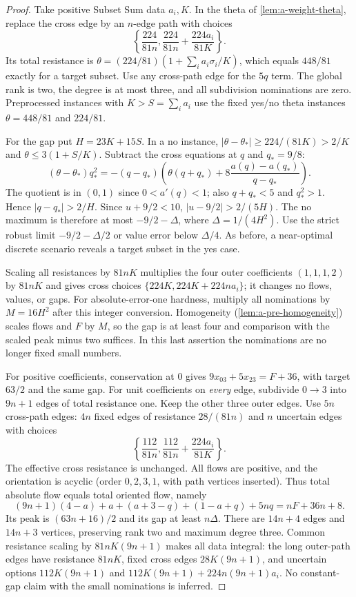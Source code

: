\begin{proof}
Take positive Subset Sum data $a_i,K$. In the theta of
\cref{lem:a-weight-theta}, replace the cross edge by an $n$-edge path
with choices
\[
 \left\{\frac{224}{81n},
 \frac{224}{81n}+\frac{224a_i}{81K}\right\}.
\]
Its total resistance is
$\theta=(224/81)(1+\sum_i a_i\sigma_i/K)$, which equals $448/81$
exactly for a target subset. Use any cross-path edge for the $5q$ term.
The global rank is two, the degree is at most three, and all subdivision
nominations are zero. Preprocessed instances with $K>S=\sum_i a_i$ use
the fixed yes/no theta instances $\theta=448/81$ and $224/81$.

For the gap put $H=23K+15S$. In a no instance,
$|\theta-\theta_*|\ge224/(81K)>2/K$ and
$\theta\le3(1+S/K)$. Subtract the cross equations at $q$ and $q_*=9/8$:
\[
 (\theta-\theta_*)q_*^2
 =-(q-q_*)\left(\theta(q+q_*)+
       8\frac{a(q)-a(q_*)}{q-q_*}\right).
\]
The quotient is in $(0,1)$ since $0<a'(q)<1$; also $q+q_*<5$ and
$q_*^2>1$. Hence $|q-q_*|>2/H$.
Since $u+9/2<10$, $|u-9/2|>2/(5H)$.
The no maximum is therefore at most $-9/2-\Delta$, where
$\Delta=1/(4H^2)$. Use the strict robust limit $-9/2-\Delta/2$ or
value error below $\Delta/4$. As before, a near-optimal discrete scenario
reveals a target subset in the yes case.

Scaling all resistances by $81nK$ multiplies the four outer coefficients
$(1,1,1,2)$ by $81nK$ and gives cross choices
$\{224K,224K+224na_i\}$; it changes no flows, values, or gaps.
For absolute-error-one hardness, multiply all nominations by
$M=16H^2$ after this integer conversion. Homogeneity
(\cref{lem:a-pre-homogeneity}) scales flows and $F$ by $M$, so the gap
is at least four and comparison with the scaled peak minus two suffices.
In this last assertion the nominations are no longer fixed small numbers.

For positive coefficients, conservation at $0$ gives
$9x_{03}+5x_{23}=F+36$, with target $63/2$ and the same gap.
For unit coefficients on \emph{every} edge, subdivide $0\to3$ into
$9n+1$ edges of total resistance one. Keep the other three outer edges.
Use $5n$ cross-path edges: $4n$ fixed edges of resistance $28/(81n)$
and $n$ uncertain edges with choices
\[
 \left\{\frac{112}{81n},
 \frac{112}{81n}+\frac{224a_i}{81K}\right\}.
\]
The effective cross resistance is unchanged. All flows are positive, and
the orientation is acyclic (order $0,2,3,1$, with path vertices inserted).
Thus total absolute flow equals total oriented flow, namely
\[
 (9n+1)(4-a)+a+(a+3-q)+(1-a+q)+5nq
   =nF+36n+8.
\]
Its peak is $(63n+16)/2$ and its gap at least $n\Delta$.
There are $14n+4$ edges and $14n+3$ vertices, preserving rank two and
maximum degree three. Common resistance scaling by
$81nK(9n+1)$ makes all data integral: the long outer-path edges have
resistance $81nK$, fixed cross edges $28K(9n+1)$, and uncertain options
$112K(9n+1)$ and $112K(9n+1)+224n(9n+1)a_i$.
No constant-gap claim with the small nominations is inferred.


\end{proof}
